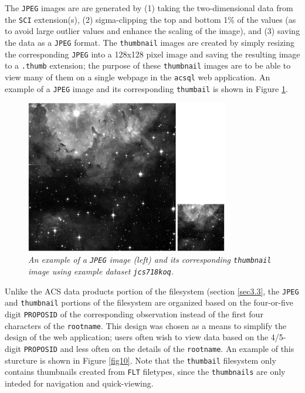 \documentclass[10pt,journal,compsoc]{IEEEtran}
\begin{document}
The \texttt{JPEG} images are are generated by (1) taking the two-dimensional data from the \texttt{SCI} extension(s), (2) sigma-clipping the top and bottom 1\% of the values (as to avoid large
outlier values and enhance the scaling of the image), and (3) saving the data as a \texttt{JPEG} format.  The \texttt{thumbnail} images are created by simply resizing the corresponding
\texttt{JPEG} into a 128x128 pixel image and saving the resulting image to a \texttt{.thumb} extension; the purpose of these \texttt{thumbnail} images are to be able to view many of them on a
single webpage in the \texttt{acsql} web application.  An example of a \texttt{JPEG} image and its corresponding \texttt{thumbail} is shown in Figure \ref{fig9}.

\begin{figure}[!h]
\centering
\includegraphics[width=3.5in]{./figures/jpeg_and_thumbnail.png}
\caption{\textit{An example of a \texttt{JPEG} image (left) and its corresponding \texttt{thumbnail} image using example dataset \texttt{jcs718koq}.}}
\label{fig9}
\end{figure}

Unlike the ACS data products portion of the filesystem (section \ref{sec3.3}, the \texttt{JPEG} and \texttt{thumbnail} portions of the filesystem are organized based on the
four-or-five digit \texttt{PROPOSID} of the corresponding observation instead of the first four characters of the \texttt{rootname}.  This design was chosen as a means to simplify the
design of the web application; users often wish to view data based on the 4/5-digit \texttt{PROPOSID} and less often on the details of the \texttt{rootname}.  An example of this
sturcture is shown in Figure \ref{fig10}.  Note that the \texttt{thumbail} filesystem only contains thumbnails created from \texttt{FLT} filetypes, since the \texttt{thumbnails} are only
inteded for navigation and quick-viewing.
\end{document}
